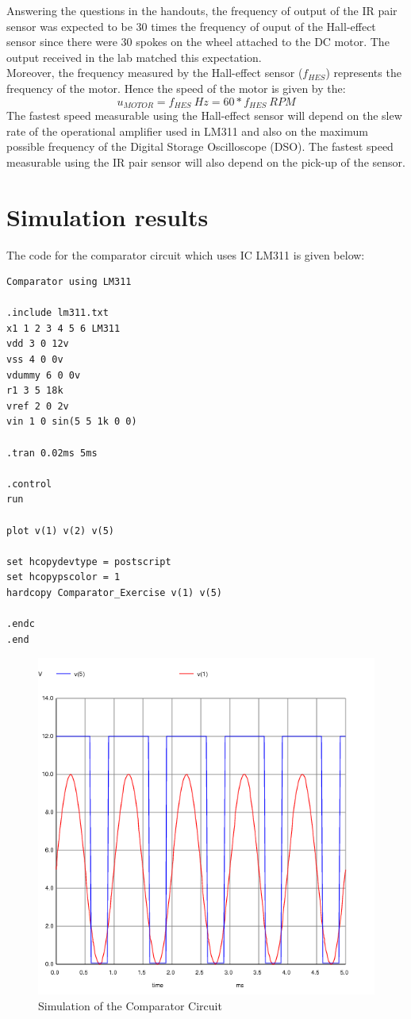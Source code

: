 \documentclass[12pt]{article}
\begin{document}
Answering the questions in the handouts, the frequency of output of the IR pair sensor was expected to be 30 times the frequency of ouput of the Hall-effect sensor since there were 30 spokes on the wheel attached to the DC motor. The output received in the lab matched this expectation.\\
Moreover, the frequency measured by the Hall-effect sensor (\(f_{HES}\)) represents the frequency of the motor. Hence the speed of the motor is given by the: \[ u_{MOTOR} = f_{HES}\ Hz = 60*f_{HES}\ RPM \]
The fastest speed measurable using the Hall-effect sensor will depend on the slew rate of the operational amplifier used in LM311 and also on the maximum possible frequency of the Digital Storage Oscilloscope (DSO). The fastest speed measurable using the IR pair sensor will also depend on the pick-up of the sensor.

\section{Simulation results}

The code for the comparator circuit which uses IC LM311 is given below:
\begin{verbatim}
Comparator using LM311

.include lm311.txt
x1 1 2 3 4 5 6 LM311
vdd 3 0 12v
vss 4 0 0v
vdummy 6 0 0v
r1 3 5 18k
vref 2 0 2v
vin 1 0 sin(5 5 1k 0 0)

.tran 0.02ms 5ms

.control
run

plot v(1) v(2) v(5)

set hcopydevtype = postscript
set hcopypscolor = 1
hardcopy Comparator_Exercise v(1) v(5)

.endc
.end
\end{verbatim}

\begin{figure}[H]
	\centering
	\includegraphics[width = 0.75\linewidth, trim = {0 0 0 0}, clip]{Comparator_Exercise.png}
	\caption{Simulation of the Comparator Circuit}
\end{figure}
\end{document}
